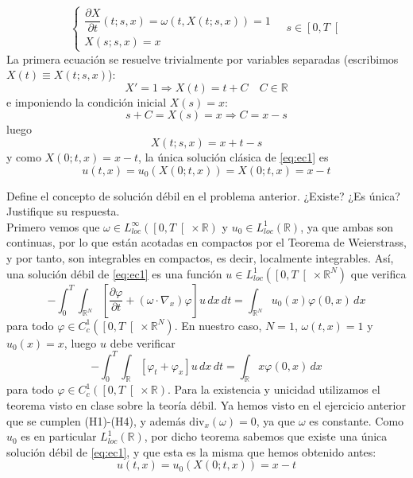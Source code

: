 \documentclass[12pt]{article}
\newcommand{\R}{\mathbb{R}}
\begin{document}
\begin{ejercicio}
        \begin{equation*}
            \begin{cases}
                \dfrac{\partial X}{\partial t}(t;s,x)
                =\omega(t,X(t;s,x)) = 1\\[6pt]
                X(s;s,x)=x
            \end{cases}\quad s \in \left[0, T \right[
        \end{equation*}
        La primera ecuación se resuelve trivialmente por variables separadas (escribimos $X(t) \equiv X(t;s,x)$):
        $$X' = 1 \Longrightarrow X(t) = t + C \quad C \in \R$$
        e imponiendo la condición inicial $X(s) = x$:
        $$s + C = X(s) = x \Longrightarrow C = x - s$$
        luego
        $$X(t;s,x) = x + t - s$$
        y como $X(0;t,x) = x - t$, la única solución clásica de \eqref{eq:ec1} es
        $$\boxed{u(t,x) = u_0(X(0;t,x)) = X(0;t,x) = x - t}$$
    \end{ejercicio}

    \begin{ejercicio}
        Define el concepto de solución débil en el problema anterior. ¿Existe? ¿Es única? Justifique su 
        respuesta. \\

        Primero vemos que $\omega \in L^\infty_{loc}(\left[0, T \right[ \times \R)$ y $u_0 \in L_{loc}^1(\R)$, ya que 
        ambas son continuas, por lo que están acotadas en compactos por el Teorema de Weierstrass, y por tanto,
        son integrables en compactos, es decir, localmente integrables. Así, una 
        solución débil de \eqref{eq:ec1} es una función $u \in L^1_{loc}(\left[0, T \right[ \times \R^N)$ que verifica 
        $$- \int_{0}^{T} \int_{\R^N} \left[ \dfrac{\partial \varphi}{\partial t} + (\omega \cdot \nabla_x) \varphi \right] u \,dx\,dt = \int_{\R^N} u_0(x) \varphi(0,x)\,dx$$ 
        para todo $\varphi \in C_c^1(\left[0,T \right[ \times \R^N)$. En nuestro caso, $N=1$, 
        $\omega(t,x) = 1$ y $u_0(x) = x$, luego $u$ debe verificar 
        $$- \int_{0}^{T} \int_{\R} \left[ \varphi_t + \varphi_x \right] u \,dx\,dt = \int_{\R} x \varphi(0,x)\,dx$$
        para todo $\varphi \in C_c^1(\left[0,T \right[ \times \R)$. Para la existencia y unicidad utilizamos el 
        teorema visto en clase sobre la teoría débil. Ya hemos visto en el ejercicio anterior que se cumplen (H1)-(H4), y 
        además $\text{div}_x(\omega) = 0$, ya que $\omega$ es constante. Como $u_0$ es en particular $L_{loc}^1(\R)$, por dicho teorema
        sabemos que existe una única solución débil de \eqref{eq:ec1}, y que esta es la misma que hemos obtenido antes:
        $$\boxed{u(t,x) = u_0(X(0;t,x)) = x - t}$$
    \end{ejercicio}
\end{document}
